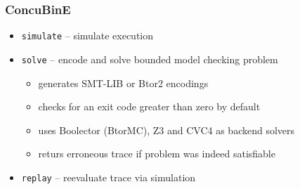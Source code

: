 \documentclass{beamer}
\begin{document}
\begin{frame}
  \frametitle{ConcuBinE}
  \vspace{-.5cm}
  \begin{center}
    \scalebox{.8}{}
  \end{center}
  \begin{itemize}
    \item \texttt{simulate} -- simulate execution
    \item \texttt{solve} -- encode and solve bounded model checking problem
      \begin{itemize}
        \item generates SMT-LIB or Btor2 encodings
        \item checks for an exit code greater than zero by default
        \item uses Boolector (BtorMC), Z3 and CVC4 as backend solvers
        \item returs erroneous trace if problem was indeed satisfiable
      \end{itemize}
    \item \texttt{replay} -- reevaluate trace via simulation
  \end{itemize}
\end{frame}
\end{document}

